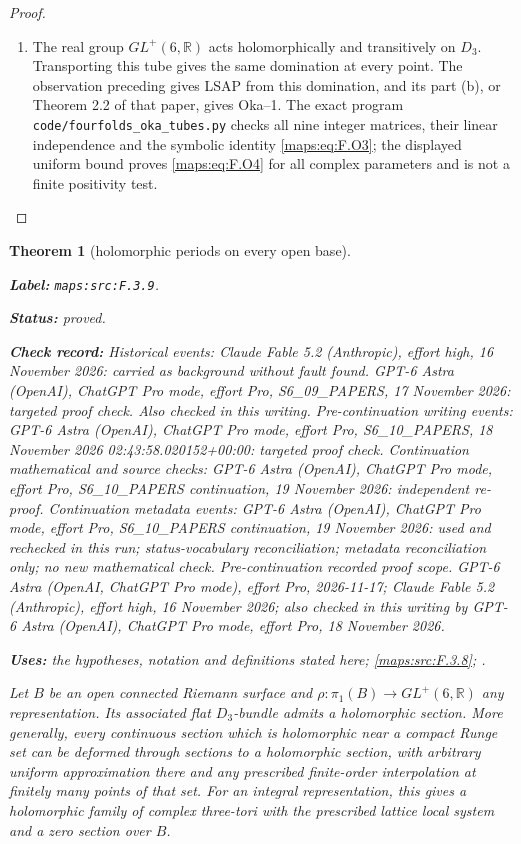 \documentclass[11pt,a4paper]{article}
\newtheorem{theorem}{Theorem}[section]
\theoremstyle{definition}
\newcommand{\StatementRecord}[4]{\par\smallskip\begingroup\upshape\raggedright\noindent\textbf{Label:} \nolinkurl{#1}.\par\noindent\textbf{Status:} #2.\par\noindent\textbf{Check record:} #3.\par\noindent\textbf{Uses:} #4.\par\endgroup\smallskip}
\begin{document}
\begin{proof}
\begin{enumerate}[label=\arabic*.]
\item The real group $GL^+(6,\mathbb R)$ acts holomorphically and
transitively on $D_3$.  Transporting this tube gives the same
domination at every point.  The observation preceding
\cite[Proposition 7.13 and preceding paragraph, pp.~23--24]{IVVOkaOneV5} gives LSAP from
this domination, and its part (b), or Theorem 2.2 of that paper,
gives Oka--1.  The exact program
\texttt{code/fourfolds\_oka\_tubes.py} checks all nine integer
matrices, their linear independence and the symbolic identity
\eqref{maps:eq:F.O3}; the displayed uniform bound proves \eqref{maps:eq:F.O4} for all complex
parameters and is not a finite positivity test.

\end{enumerate}
\end{proof}




\begin{theorem}[holomorphic periods on every open base]\label{maps:src:F.3.9}
\StatementRecord{maps:src:F.3.9}{proved}{Historical events: Claude Fable 5.2 (Anthropic), effort high, 16 November 2026: carried as background without fault found. GPT-6 Astra (OpenAI), ChatGPT Pro mode, effort Pro, S6\_09\_PAPERS, 17 November 2026: targeted proof check. Also checked in this writing. Pre-continuation writing events: GPT-6 Astra (OpenAI), ChatGPT Pro mode, effort Pro, S6\_10\_PAPERS, 18 November 2026 02:43:58.020152+00:00: targeted proof check. Continuation mathematical and source checks: GPT-6 Astra (OpenAI), ChatGPT Pro mode, effort Pro, S6\_10\_PAPERS continuation, 19 November 2026: independent re-proof. Continuation metadata events: GPT-6 Astra (OpenAI), ChatGPT Pro mode, effort Pro, S6\_10\_PAPERS continuation, 19 November 2026: used and rechecked in this run; status-vocabulary reconciliation; metadata reconciliation only; no new mathematical check. \emph{Pre-continuation recorded proof scope.} GPT-6 Astra (OpenAI, ChatGPT Pro mode), effort Pro, 2026-11-17; Claude Fable 5.2 (Anthropic), effort high, 16 November 2026; also checked in this writing by GPT-6 Astra (OpenAI), ChatGPT Pro mode, effort Pro, 18 November 2026}{the hypotheses, notation and definitions stated here; \cref{maps:src:F.3.8}; \cite[Proposition 7.13(d), p.~24]{IVVOkaOneV5}}


Let $B$ be an open connected Riemann surface and
$\rho:\pi_1(B)\to GL^+(6,\mathbb R)$ any representation.
Its associated flat $D_3$-bundle admits a holomorphic section.
More generally, every continuous section which is holomorphic
near a compact Runge set can be deformed through sections to a
holomorphic section, with arbitrary uniform approximation there
and any prescribed finite-order interpolation at finitely many
points of that set.  For an integral representation, this gives
a holomorphic family of complex three-tori with the prescribed
lattice local system and a zero section over $B$.

\end{theorem}
\end{document}

